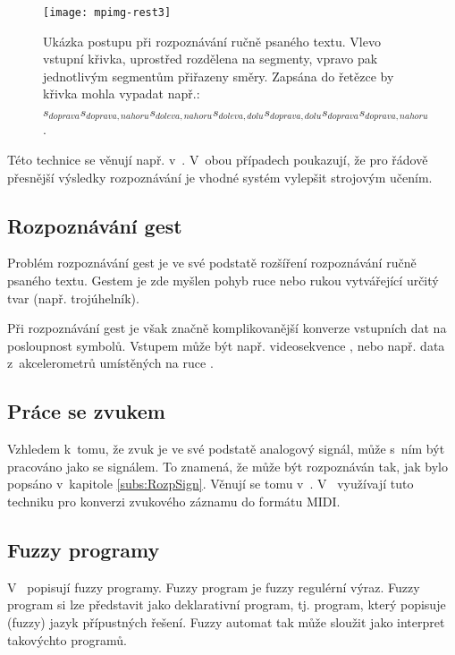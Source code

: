 \begin{figure}
 \texttt{[image: mpimg-rest3]}
 
 \caption[Ukázka postupu při rozpoznávání ručně psaného textu]{Ukázka postupu při rozpoznávání ručně psaného textu. Vlevo vstupní křivka, uprostřed rozdělena na segmenty, vpravo pak jednotlivým segmentům přiřazeny směry. Zapsána do řetězce by křivka mohla vypadat např.: $s_{doprava} s_{doprava,nahoru} s_{doleva,nahoru} s_{doleva,dolu} s_{doprava,dolu} s_{doprava} s_{doprava,nahoru}$.}
 \label{img:HandWritEx}
\end{figure}

Této technice se věnují např. v~\cite{AstGariGonVillFar-ApprStrMatUsiDefFuzzAutLearExpr, WeeFu-FormFuzAutAppModLeaSys}. V~obou případech poukazují, že pro řádově přesnější výsledky rozpoznávání je vhodné systém vylepšit strojovým učením.

\subsection{Rozpoznávání gest} \label{subs:GestRec}
Problém rozpoznávání gest je ve své podstatě rozšíření rozpoznávání ručně psaného textu. Gestem je zde myšlen pohyb ruce nebo rukou vytvářející určitý tvar (např. trojúhelník).

Při rozpoznávání gest je však značně komplikovanější konverze vstupních dat na posloupnost symbolů. Vstupem může být např. videosekvence \cite{Tho-FinFuzzAutRegFuzLangPatRec}, nebo např. data z~akcelerometrů umístěných na ruce \cite{BaiTri-PattRecUsiTemFuzzAut}.

\subsection{Práce se zvukem}
Vzhledem k~tomu, že zvuk je ve své podstatě analogový signál, může s~ním být pracováno jako se signálem. To znamená, že může být rozpoznáván tak, jak bylo popsáno v~kapitole \ref{subs:RozpSign}. Věnují se tomu v~\cite{ForBel-GenMusAccUsFinStaTra, OliWag-ComMusNeuNetProFiStMa}. V~\cite{ForBel-GenMusAccUsFinStaTra} využívají tuto techniku pro konverzi zvukového záznamu do formátu MIDI.

\subsection{Fuzzy programy}
V~\cite{Cha-ExeFuzProUsFiStaMa} popisují fuzzy programy. Fuzzy program je fuzzy regulérní výraz. Fuzzy program si lze představit jako deklarativní program, tj. program, který popisuje (fuzzy) jazyk přípustných řešení. Fuzzy automat tak může sloužit jako interpret takovýchto programů. 

